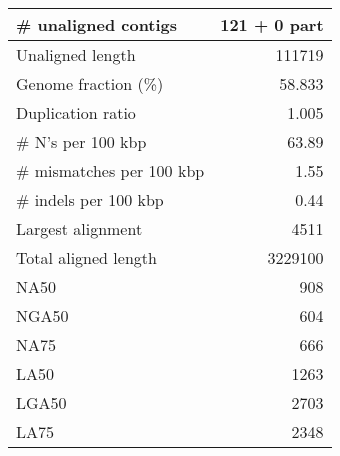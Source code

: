 \documentclass[12pt,a4paper]{article}
\begin{document}
\begin{table}[ht]
\begin{center}
\begin{tabular}{|l*{1}{|r}|}
\# unaligned contigs & 121 + 0 part \\ \hline
Unaligned length & 111719 \\ \hline
Genome fraction (\%) & 58.833 \\ \hline
Duplication ratio & 1.005 \\ \hline
\# N's per 100 kbp & 63.89 \\ \hline
\# mismatches per 100 kbp & 1.55 \\ \hline
\# indels per 100 kbp & 0.44 \\ \hline
Largest alignment & 4511 \\ \hline
Total aligned length & 3229100 \\ \hline
NA50 & 908 \\ \hline
NGA50 & 604 \\ \hline
NA75 & 666 \\ \hline
LA50 & 1263 \\ \hline
LGA50 & 2703 \\ \hline
LA75 & 2348 \\ \hline
\end{tabular}
\end{center}
\end{table}
\end{document}
